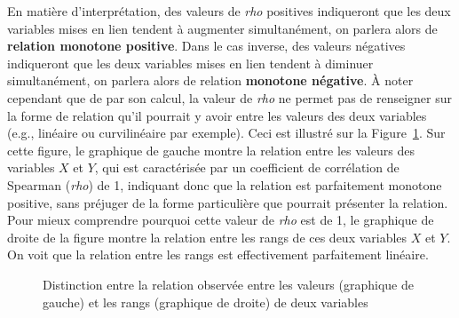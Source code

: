 \documentclass[
  letterpaper,
]{book}
\begin{document}
En matière d'interprétation, des valeurs de \emph{rho} positives
indiqueront que les deux variables mises en lien tendent à augmenter
simultanément, on parlera alors de \textbf{relation monotone positive}.
Dans le cas inverse, des valeurs négatives indiqueront que les deux
variables mises en lien tendent à diminuer simultanément, on parlera
alors de relation \textbf{monotone négative}. À noter cependant que de
par son calcul, la valeur de \emph{rho} ne permet pas de renseigner sur
la forme de relation qu'il pourrait y avoir entre les valeurs des deux
variables (e.g., linéaire ou curvilinéaire par exemple). Ceci est
illustré sur la Figure~\ref{fig-ranksvvaluesspearman}. Sur cette figure,
le graphique de gauche montre la relation entre les valeurs des
variables \(X\) et \(Y\), qui est caractérisée par un coefficient de
corrélation de Spearman (\emph{rho}) de 1, indiquant donc que la
relation est parfaitement monotone positive, sans préjuger de la forme
particulière que pourrait présenter la relation. Pour mieux comprendre
pourquoi cette valeur de \emph{rho} est de 1, le graphique de droite de
la figure montre la relation entre les rangs de ces deux variables \(X\)
et \(Y\). On voit que la relation entre les rangs est effectivement
parfaitement linéaire.

\begin{figure}


\caption{\label{fig-ranksvvaluesspearman}Distinction entre la relation
observée entre les valeurs (graphique de gauche) et les rangs (graphique
de droite) de deux variables}

\end{figure}%
\end{document}
